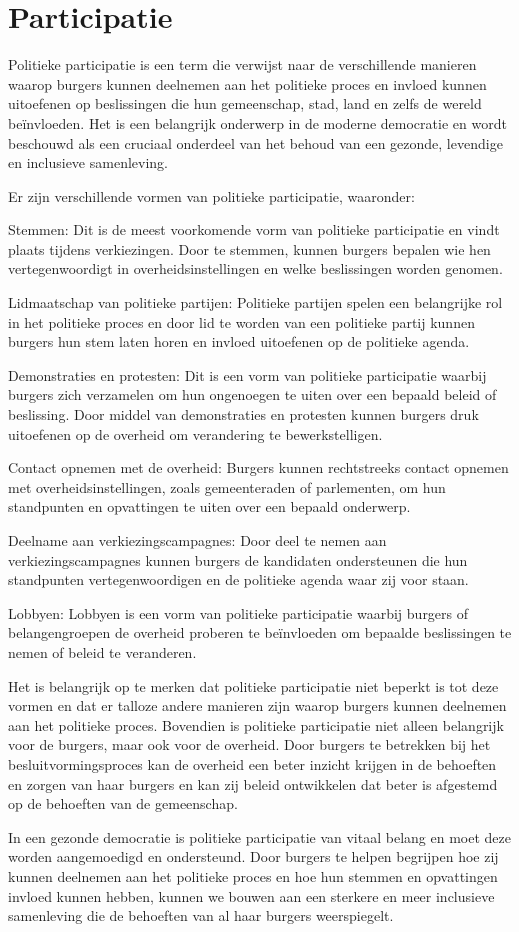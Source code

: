\section{Participatie}

Politieke participatie is een term die verwijst naar de verschillende manieren waarop burgers kunnen deelnemen aan het politieke proces en invloed kunnen uitoefenen op beslissingen die hun gemeenschap, stad, land en zelfs de wereld beïnvloeden. Het is een belangrijk onderwerp in de moderne democratie en wordt beschouwd als een cruciaal onderdeel van het behoud van een gezonde, levendige en inclusieve samenleving.

Er zijn verschillende vormen van politieke participatie, waaronder:

Stemmen: Dit is de meest voorkomende vorm van politieke participatie en vindt plaats tijdens verkiezingen. Door te stemmen, kunnen burgers bepalen wie hen vertegenwoordigt in overheidsinstellingen en welke beslissingen worden genomen.

Lidmaatschap van politieke partijen: Politieke partijen spelen een belangrijke rol in het politieke proces en door lid te worden van een politieke partij kunnen burgers hun stem laten horen en invloed uitoefenen op de politieke agenda.

Demonstraties en protesten: Dit is een vorm van politieke participatie waarbij burgers zich verzamelen om hun ongenoegen te uiten over een bepaald beleid of beslissing. Door middel van demonstraties en protesten kunnen burgers druk uitoefenen op de overheid om verandering te bewerkstelligen.

Contact opnemen met de overheid: Burgers kunnen rechtstreeks contact opnemen met overheidsinstellingen, zoals gemeenteraden of parlementen, om hun standpunten en opvattingen te uiten over een bepaald onderwerp.

Deelname aan verkiezingscampagnes: Door deel te nemen aan verkiezingscampagnes kunnen burgers de kandidaten ondersteunen die hun standpunten vertegenwoordigen en de politieke agenda waar zij voor staan.

Lobbyen: Lobbyen is een vorm van politieke participatie waarbij burgers of belangengroepen de overheid proberen te beïnvloeden om bepaalde beslissingen te nemen of beleid te veranderen.

Het is belangrijk op te merken dat politieke participatie niet beperkt is tot deze vormen en dat er talloze andere manieren zijn waarop burgers kunnen deelnemen aan het politieke proces. Bovendien is politieke participatie niet alleen belangrijk voor de burgers, maar ook voor de overheid. Door burgers te betrekken bij het besluitvormingsproces kan de overheid een beter inzicht krijgen in de behoeften en zorgen van haar burgers en kan zij beleid ontwikkelen dat beter is afgestemd op de behoeften van de gemeenschap.

In een gezonde democratie is politieke participatie van vitaal belang en moet deze worden aangemoedigd en ondersteund. Door burgers te helpen begrijpen hoe zij kunnen deelnemen aan het politieke proces en hoe hun stemmen en opvattingen invloed kunnen hebben, kunnen we bouwen aan een sterkere en meer inclusieve samenleving die de behoeften van al haar burgers weerspiegelt.
